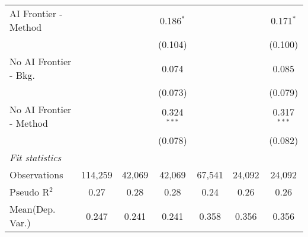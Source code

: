 \begin{tabular}{lcccccc}
   AI Frontier - Method    &               &               & 0.186$^{*}$   &               &               & 0.171$^{*}$\\   
                           &               &               & (0.104)       &               &               & (0.100)\\   
   No AI Frontier - Bkg.   &               &               & 0.074         &               &               & 0.085\\   
                           &               &               & (0.073)       &               &               & (0.079)\\   
   No AI Frontier - Method &               &               & 0.324$^{***}$ &               &               & 0.317$^{***}$\\   
                           &               &               & (0.078)       &               &               & (0.082)\\   
   \midrule
   \emph{Fit statistics}\\
   Observations            & 114,259       & 42,069        & 42,069        & 67,541        & 24,092        & 24,092\\  
   Pseudo R$^2$            & 0.27          & 0.28          & 0.28          & 0.24          & 0.26          & 0.26\\  
Mean(Dep. Var.) & 0.247 & 0.241 & 0.241 & 0.358 & 0.356 & 0.356 \\
   

\end{tabular}
